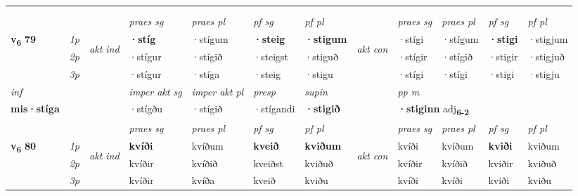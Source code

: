 \begin{longtable}[l]{X>{\footnotesize\itshape}llXXXXlXXXX}
\midrule

   & \\*
  & \\
   \midrule
 & &   & \textit{praes sg}  & \textit{praes pl}    & \textit{ pf sg} & \textit{pf pl} & & \textit{praes sg}  & \textit{praes pl}    & \textit{pf sg} & \textit{pf pl }  \\ \cmidrule{4-7} \cmidrule{9-12}
 \multirow{2}{*}{{{\textbf{v{\textsubscript{6}}} \Large{\textbf{79}}}}}  & 1p & \multirow{3}{*}{\begin{turn}{90}\textit{akt ind}\end{turn}} & \textbf{·stíg} & ·stígum & \textbf{·steig} & \textbf{·stigum} & \multirow{3}{*}{\begin{turn}{90}\textit{akt con}\end{turn}} &·stígi & ·stígum & \textbf{·stigi} & ·stigjum\\*
 & 2p &  &  ·stígur  & ·stígið & ·steigst & ·stiguð & & ·stígir & ·stígið & ·stigir & ·stigjuð \\*
 & 3p &  & ·stígur & ·stíga & ·steig & ·stigu & & ·stígi & ·stígi& ·stigi & ·stigju \\*
\cmidrule{4-7} \cmidrule{9-12}

   {\textit{inf}} & &  & \textit{imper akt sg} & \textit{imper akt pl}   & \textit{presp} & \textit{supin}  && \textit{pp m} \\*
  {\textbf{mis\allowbreak ·stíga}} & && ·stígðu  & ·stígið   & ·stígandi &  \textbf{·stigið}  && \multicolumn{2}{l}{\textbf{·stiginn} adj\textbf{\textsubscript{6-2}}} \\*

\midrule

 & &   & \textit{praes sg}  & \textit{praes pl}    & \textit{ pf sg} & \textit{pf pl} & & \textit{praes sg}  & \textit{praes pl}    & \textit{pf sg} & \textit{pf pl }  \\ \cmidrule{4-7} \cmidrule{9-12}
 \multirow{2}{*}{{{\textbf{v{\textsubscript{6}}} \Large{\textbf{80}}}}}  & 1p & \multirow{3}{*}{\begin{turn}{90}\textit{akt ind}\end{turn}} & \textbf{kvíði} & kvíðum & \textbf{kveið} & \textbf{kviðum} & \multirow{3}{*}{\begin{turn}{90}\textit{akt con}\end{turn}} &kvíði & kvíðum & \textbf{kviði} & kviðum\\*
 & 2p &  &  kvíðir  & kvíðið & kveiðst & kviðuð & & kvíðir & kvíðið & kviðir & kviðuð \\*
 & 3p &  & kvíðir & kvíða & kveið & kviðu & & kvíði & kvíði& kviði & kviðu \\*
\cmidrule{4-7} \cmidrule{9-12}


\end{longtable}
